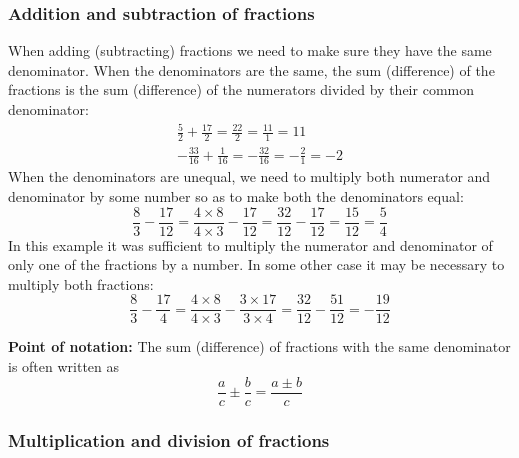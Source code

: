 \subsubsection{Addition and subtraction of fractions}

\noindent When adding (subtracting) fractions we need to make sure they have the same denominator. When the denominators are the same, the sum (difference) of the fractions is the sum (difference) of the numerators divided by their common denominator:
\begin{eqnarray*}
\frac{5}{2} + \frac{17}{2} = \frac{22}{2} = \frac{11}{1} = 11\\
-\frac{33}{16} + \frac{1}{16} = -\frac{32}{16} = -\frac{2}{1} = -2
\end{eqnarray*} 
When the denominators are unequal, we need to multiply both numerator and denominator by some number so as to make both the denominators equal:
\begin{equation*}
\frac{8}{3} - \frac{17}{12} = \frac{4 \times 8}{4 \times 3} - \frac{17}{12} = \frac{32}{12} - \frac{17}{12} = \frac{15}{12} = \frac{5}{4}
\end{equation*}
In this example it was sufficient to multiply the numerator and denominator of only one of the fractions by a number. In some other case it may be necessary to multiply both fractions:
\begin{equation*}
\frac{8}{3} - \frac{17}{4} = \frac{4 \times 8}{4 \times 3} - \frac{3 \times 17}{3 \times 4} = \frac{32}{12} - \frac{51}{12} = -\frac{19}{12}
\end{equation*}

\noindent \textbf{Point of notation:} The sum (difference) of fractions with the same denominator is often written as
$$
\frac{a}{c} \pm \frac{b}{c} = \frac{a \pm b}{c} 
$$

\subsubsection{Multiplication and division of fractions}

